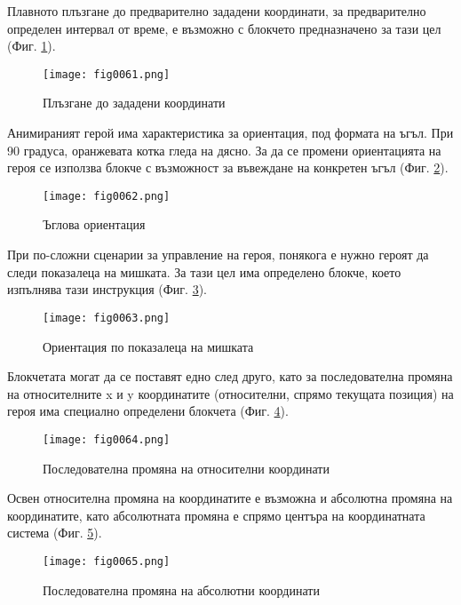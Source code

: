 Плавното плъзгане до предварително зададени координати, за предварително определен интервал от време, е възможно с блокчето предназначено за тази цел (Фиг. \ref{fig0061}).

\begin{figure}[H]
  \centering
  \texttt{[image: fig0061.png]}
  \caption{Плъзгане до зададени координати}
\label{fig0061}
\end{figure}

Анимираният герой има характеристика за ориентация, под формата на ъгъл. При 90 градуса, оранжевата котка гледа на дясно. За да се промени ориентацията на героя се използва блокче с възможност за въвеждане на конкретен ъгъл (Фиг. \ref{fig0062}).

\begin{figure}[H]
  \centering
  \texttt{[image: fig0062.png]}
  \caption{Ъглова ориентация}
\label{fig0062}
\end{figure}

При по-сложни сценарии за управление на героя, понякога е нужно героят да следи показалеца на мишката. За тази цел има определено блокче, което изпълнява тази инструкция (Фиг. \ref{fig0063}).

\begin{figure}[H]
  \centering
  \texttt{[image: fig0063.png]}
  \caption{Ориентация по показалеца на мишката}
\label{fig0063}
\end{figure}

Блокчетата могат да се поставят едно след друго, като за последователна промяна на относителните x и y координатите (относителни, спрямо текущата позиция) на героя има специално определени блокчета (Фиг. \ref{fig0064}).

\begin{figure}[H]
  \centering
  \texttt{[image: fig0064.png]}
  \caption{Последователна промяна на относителни координати}
\label{fig0064}
\end{figure}

Освен относителна промяна на координатите е възможна и абсолютна промяна на координатите, като абсолютната промяна е спрямо центъра на координатната система (Фиг. \ref{fig0065}).

\begin{figure}[H]
  \centering
  \texttt{[image: fig0065.png]}
  \caption{Последователна промяна на абсолютни координати}
\label{fig0065}
\end{figure}

